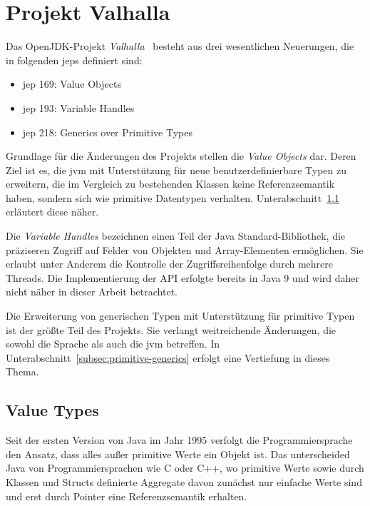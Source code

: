\section{Projekt Valhalla}\label{sec:valhalla}

Das OpenJDK-Projekt \emph{Valhalla}~\cite{openjdk-valhalla} besteht aus drei wesentlichen Neuerungen, die in folgenden \acp{jep} definiert sind:

\begin{itemize}
    \item \ac{jep} 169: Value Objects~\cite{jep-169}
    \item \ac{jep} 193: Variable Handles~\cite{jep-193}
    \item \ac{jep} 218: Generics over Primitive Types~\cite{jep-218}
\end{itemize}

Grundlage für die Änderungen des Projekts stellen die \emph{Value Objects} dar.
Deren Ziel ist es, die \ac{jvm} mit Unterstützung für neue benutzerdefinierbare Typen zu erweitern, die im Vergleich zu bestehenden Klassen keine Referenzsemantik haben, sondern sich wie primitive Datentypen verhalten.
Unterabschnitt~\ref{subsec:value-types} erläutert diese näher.

Die \emph{Variable Handles} bezeichnen einen Teil der Java Standard-Bibliothek, die präziseren Zugriff auf Felder von Objekten und Array-Elementen ermöglichen.
Sie erlaubt unter Anderem die Kontrolle der Zugriffsreihenfolge durch mehrere Threads. %
Die Implementierung der API erfolgte bereits in Java 9 und wird daher nicht näher in dieser Arbeit betrachtet.

Die Erweiterung von generischen Typen mit Unterstützung für primitive Typen ist der größte Teil des Projekts.
Sie verlangt weitreichende Änderungen, die sowohl die Sprache als auch die \ac{jvm} betreffen.
In Unterabschnitt~\ref{subsec:primitive-generics} erfolgt eine Vertiefung in dieses Thema.

\subsection{Value Types}\label{subsec:value-types}

Seit der ersten Version von Java im Jahr 1995 verfolgt die Programmiersprache den Ansatz, dass alles außer primitive Werte ein Objekt ist.
Das unterscheided Java von Programmiersprachen wie C oder C++, wo primitive Werte sowie durch Klassen und Structs definierte Aggregate davon zunächst nur einfache Werte sind und erst durch Pointer eine Referenzsemantik erhalten.

